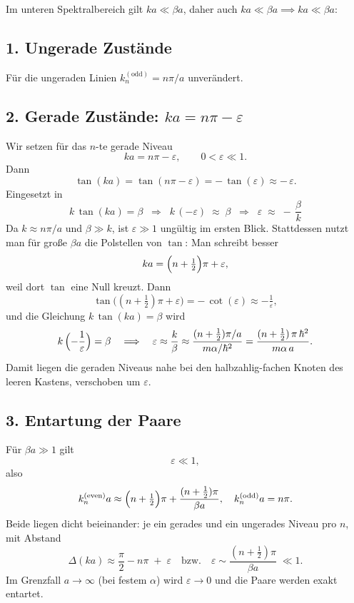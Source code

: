 \documentclass[a4paper,12pt]{article}
\begin{document}
Im unteren Spektralbereich gilt $k a \ll \beta a$, daher auch $k a \ll \beta a \implies k a \ll \beta a$:

\subsection*{1. Ungerade Zustände}
Für die ungeraden Linien $k_n^{(\text{odd})}=n\pi/a$ unverändert. 

\subsection*{2. Gerade Zustände: $k a = n\pi - \varepsilon$}
Wir setzen für das $n$-te gerade Niveau
\[
k a = n\pi - \varepsilon,\qquad 0<\varepsilon\ll1.
\]
Dann
\[
\tan(k a) = \tan(n\pi - \varepsilon) = -\,\tan(\varepsilon)\approx -\,\varepsilon.
\]
Eingesetzt in
\[
k\,\tan(k a) = \beta
\;\;\Longrightarrow\;\;
k\,(-\varepsilon) \;\approx\;\beta
\;\;\Longrightarrow\;\;
\varepsilon \;\approx\; -\,\frac{\beta}{k}
\]
Da $k\approx n\pi/a$ und $\beta\gg k$, ist $\varepsilon\gg1$ ungültig im ersten Blick. 
Stattdessen nutzt man für große $\beta a$ die Polstellen von $\tan$: 
Man schreibt besser
\[
k a = \Bigl(n+\tfrac12\Bigr)\pi + \varepsilon,
\]
weil dort $\tan$ eine Null kreuzt. Dann
\[
\tan\bigl((n+\tfrac12)\pi + \varepsilon\bigr) = -\,\cot(\varepsilon)\approx -\tfrac1\varepsilon,
\]
und die Gleichung $k\,\tan(k a)=\beta$ wird
\[
k\,\Bigl(-\frac1\varepsilon\Bigr)=\beta
\quad\Longrightarrow\quad
\varepsilon \approx \frac{k}{\beta}
\approx \frac{(n+\tfrac12)\pi/a}{m\alpha/\hbar^2}
= \frac{(n+\tfrac12)\,\pi\,\hbar^2}{m\alpha\,a}.
\]
Damit liegen die geraden Niveaus nahe bei den halbzahlig-fachen Knoten des leeren Kastens, 
verschoben um $\varepsilon$. 

\subsection*{3. Entartung der Paare}
Für $\beta a\gg1$ gilt
\[
\varepsilon \ll1,
\]
also
\[
k_n^{(\text{even})}a \approx \Bigl(n+\tfrac12\Bigr)\pi + \frac{(n+\tfrac12)\pi}{\beta a},
\quad
k_n^{(\text{odd})}a = n\pi.
\]
Beide liegen dicht beieinander: je ein gerades und ein ungerades Niveau pro $n$, mit Abstand
\[
\Delta(k a)\approx \frac{\pi}{2} - n\pi \;+\;\varepsilon
\quad\text{bzw.}\quad
\varepsilon\sim\frac{(n+\tfrac12)\pi}{\beta a}\;\ll1.
\]
Im Grenzfall $a\to\infty$ (bei festem $\alpha$) wird $\varepsilon\to0$ und die Paare 
werden exakt entartet.
\end{document}
